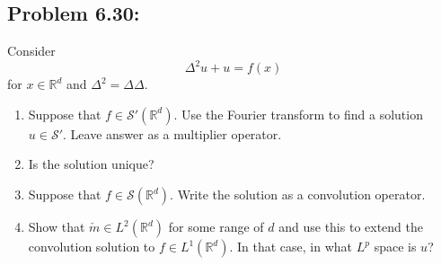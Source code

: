 \documentclass[letterpaper,twoside,11pt]{article}
\theoremstyle{mystyle}
\newcommand{\R}{{\mathbb R}}
\newcommand{\sch}{\mathcal S}
\begin{document}
\subsection*{Problem 6.30:}
Consider 
\[\Delta^2 u + u = f(x)\] 
for $x\in \R^d$ and $\Delta^2 = \Delta\Delta$. 
\begin{enumerate}
  \item Suppose that $f \in \sch ' \left( \R^d  \right)$. Use the Fourier transform to find a solution $u \in \sch'$. Leave answer as a multiplier operator. 
  \item Is the solution unique? 
  \item Suppose that $f \in \sch \left( \R^d  \right)$. Write the solution as a convolution operator. 
  \item Show that $\check{m}\in L^2 \left( \R^d \right)$ for some range of $d$ and use this to extend the convolution solution to $f\in L^1\left( \R^d \right)$. In that case, in what $L^p$ space is $u$? 
\end{enumerate}
\end{document}
